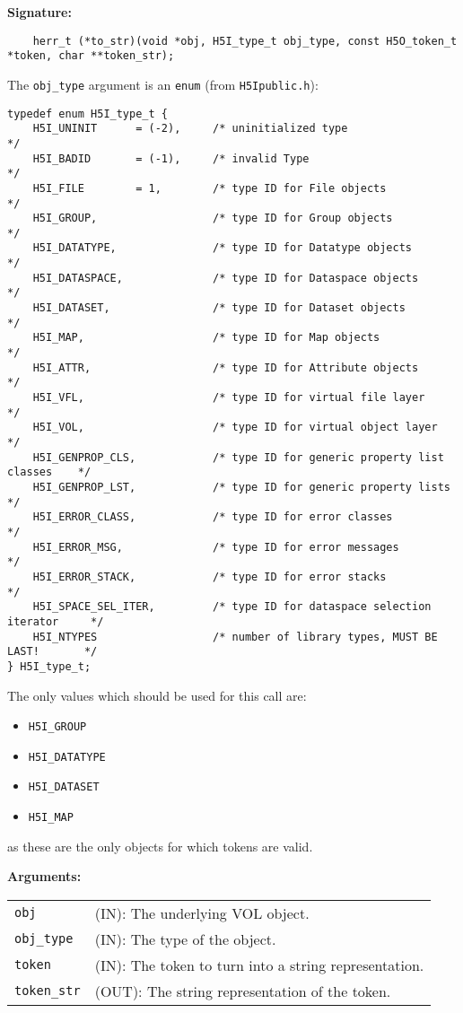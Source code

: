 \begin{mdframed}[style=bgbox]
\textbf{Signature:}
\begin{lstlisting}
    herr_t (*to_str)(void *obj, H5I_type_t obj_type, const H5O_token_t *token, char **token_str);
\end{lstlisting}

The \texttt{obj\_type} argument is an \texttt{enum} (from \texttt{H5Ipublic.h}):
\begin{lstlisting}
typedef enum H5I_type_t {                                                        
    H5I_UNINIT      = (-2),     /* uninitialized type                           */
    H5I_BADID       = (-1),     /* invalid Type                                 */
    H5I_FILE        = 1,        /* type ID for File objects                     */
    H5I_GROUP,                  /* type ID for Group objects                    */
    H5I_DATATYPE,               /* type ID for Datatype objects                 */
    H5I_DATASPACE,              /* type ID for Dataspace objects                */
    H5I_DATASET,                /* type ID for Dataset objects                  */
    H5I_MAP,                    /* type ID for Map objects                      */
    H5I_ATTR,                   /* type ID for Attribute objects                */
    H5I_VFL,                    /* type ID for virtual file layer               */
    H5I_VOL,                    /* type ID for virtual object layer             */
    H5I_GENPROP_CLS,            /* type ID for generic property list classes    */
    H5I_GENPROP_LST,            /* type ID for generic property lists           */
    H5I_ERROR_CLASS,            /* type ID for error classes                    */
    H5I_ERROR_MSG,              /* type ID for error messages                   */
    H5I_ERROR_STACK,            /* type ID for error stacks                     */
    H5I_SPACE_SEL_ITER,         /* type ID for dataspace selection iterator     */
    H5I_NTYPES                  /* number of library types, MUST BE LAST!       */
} H5I_type_t;
\end{lstlisting}
The only values which should be used for this call are:
\begin{itemize}
    \item \texttt{H5I\_GROUP}
    \item \texttt{H5I\_DATATYPE}
    \item \texttt{H5I\_DATASET}
    \item \texttt{H5I\_MAP}
\end{itemize}
as these are the only objects for which tokens are valid.

\textbf{Arguments:}\\
\begin{tabular}{l p{13.5cm}}
  \texttt{obj} & (IN): The underlying VOL object.\\
  \texttt{obj\_type} & (IN): The type of the object.\\
  \texttt{token} & (IN): The token to turn into a string representation.\\
  \texttt{token\_str} & (OUT): The string representation of the token.\\
\end{tabular}
\end{mdframed}

